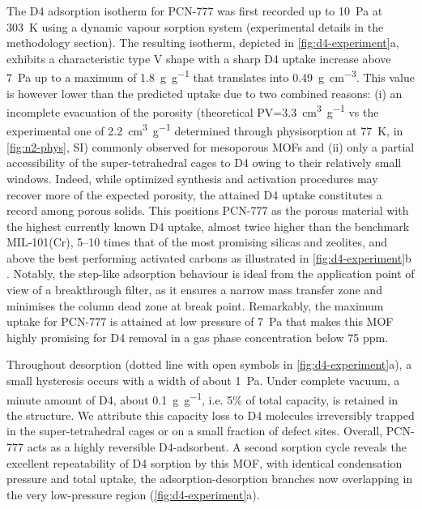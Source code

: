 The D4 adsorption isotherm for PCN-777 was first recorded up to \SI{10}{\pascal}
at \SI{303}{\kelvin} using a dynamic vapour sorption system (experimental
details in the methodology section). The resulting isotherm, depicted in
\cref{fig:d4-experiment}a, exhibits a characteristic type V shape
\citep{thommesPhysisorptionGasesSpecial2015} with a sharp D4 uptake increase
above \SI{7}{\pascal} up to a maximum of \SI{1.8}{\gram\per\gram} that
translates into \SI{0.49}{\gram\per\centi\metre\cubed}. This value is however
lower than the predicted uptake due to two combined reasons: (i) an incomplete
evacuation of the porosity (theoretical PV=\SI{3.3}{\centi\metre\cubed\per\gram}
vs the experimental one of \SI{2.2}{\centi\metre\cubed\per\gram} determined
through  physisorption at \SI{77}{\kelvin}, in \cref{fig:n2-phys}, SI)
commonly observed for mesoporous MOFs
\citep{nelsonSupercriticalProcessingRoute2009, parkCrystalStructureGuest2007}
and (ii) only a partial accessibility of the super-tetrahedral cages to D4 owing
to their relatively small windows. Indeed, while optimized synthesis and
activation procedures may recover more of the expected porosity, the attained D4
uptake constitutes a record among porous solids. This positions PCN-777 as the
porous material with the highest currently known D4 uptake, almost twice higher
than the benchmark MIL-101(Cr), 5--10 times that of the most promising silicas
and zeolites, and above the best performing activated carbons as illustrated in
\cref{fig:d4-experiment}b \citep{wangRecentAdvancesTechnologies2019}. Notably,
the step-like adsorption behaviour is ideal from the application point of view
of a breakthrough filter, as it ensures a narrow mass transfer zone and
minimises the column dead zone at break point. Remarkably, the maximum uptake
for PCN-777 is attained at low pressure of \SI{7}{\pascal} that makes this MOF
highly promising for D4 removal in a gas phase concentration below 75 ppm.

Throughout desorption (dotted line with open symbols in
\cref{fig:d4-experiment}a), a small hysteresis occurs with a width of about
\SI{1}{\pascal}. Under complete vacuum, a minute amount of D4, about
\SI{0.1}{\gram\per\gram}, i.e. 5\% of total capacity, is retained in the
structure. We attribute this capacity loss to D4 molecules irreversibly trapped
in the super-tetrahedral cages or on a small fraction of defect sites. Overall,
PCN-777 acts as a highly reversible D4-adsorbent. A second sorption cycle
reveals the excellent repeatability of D4 sorption by this MOF, with identical
condensation pressure and total uptake, the adsorption-desorption branches now
overlapping in the very low-pressure region (\cref{fig:d4-experiment}a).

